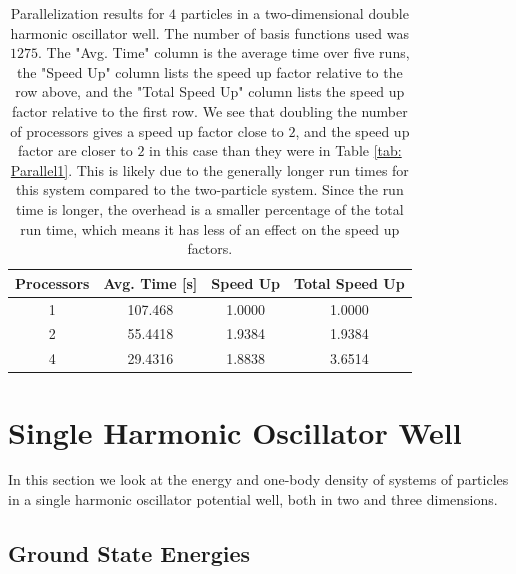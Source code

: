 \documentclass[../main.tex]{subfiles}
\begin{document}
\begin{table}[!ht]
  \centering
  \begin{tabular}{| c | c | c | c |}
    \hline
    Processors & Avg. Time [s] & Speed Up & Total Speed Up\\*
    \hline
    1 & 107.468 & 1.0000 & 1.0000\\*
    \hline
    2 & 55.4418 & 1.9384 & 1.9384\\*
    \hline
    4 & 29.4316 & 1.8838 & 3.6514\\*
    \hline
  \end{tabular}
  \caption{Parallelization results for $4$ particles in a two-dimensional double harmonic oscillator well. The number of basis functions used was $1275$. The "Avg. Time" column is the average time over five runs, the "Speed Up" column lists the speed up factor relative to the row above, and the "Total Speed Up" column lists the speed up factor relative to the first row. We see that doubling the number of processors gives a speed up factor close to $2$, and the speed up factor are closer to $2$ in this case than they were in Table \ref{tab: Parallel1}. This is likely due to the generally longer run times for this system compared to the two-particle system. Since the run time is longer, the overhead is a smaller percentage of the total run time, which means it has less of an effect on the speed up factors.}
  \label{tab: Parallel2}
\end{table}

\section{Single Harmonic Oscillator Well}

In this section we look at the energy and one-body density of systems of particles in a single harmonic oscillator potential well, both in two and three dimensions.

\subsection{Ground State Energies}\label{sec: SHO GSE}
\end{document}

